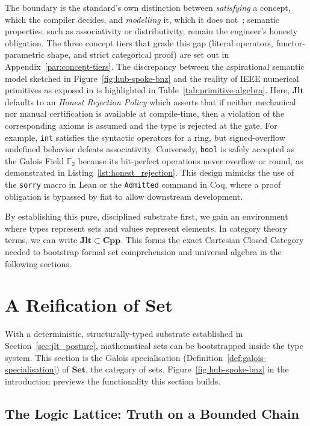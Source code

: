 \documentclass[11pt, a4paper]{article}
\begin{document}
The boundary is the standard's own distinction between \emph{satisfying} a concept, which the compiler decides, and \emph{modelling} it, which it does not~\cite{krautler2026jlt}; semantic properties, such as associativity or distributivity, remain the engineer's honesty obligation.
The three concept tiers that grade this gap (literal operators, functor-parametric shape, and strict categorical proof) are set out in Appendix~\ref{par:concept-tiers}.
The discrepancy between the aspirational semantic model sketched in Figure~\ref{fig:hub-spoke-bnz} and the reality of IEEE numerical primitives as exposed in  is highlighted in Table~\ref{tab:primitive-algebra}.
Here, $\mathbf{Jlt}$ defaults to an \emph{Honest Rejection Policy} which asserts that if neither mechanical nor manual certification is available at compile-time, then a violation of the corresponding axioms is assumed and the type is rejected at the gate.
For example, \texttt{int} satisfies the syntactic operators for a ring, but signed-overflow undefined behavior defeats associativity.
Conversely, \texttt{bool} is safely accepted as the Galois Field $\mathbb{F}_2$ because its bit-perfect operations never overflow or round, as demonstrated in Listing~\ref{lst:honest_rejection}.
This design mimicks the use of the \texttt{sorry} macro in Lean or the \texttt{Admitted} command in Coq, where a proof obligation is bypassed by fiat to allow downstream development.


By establishing this pure, disciplined substrate first, we gain an environment where types represent sets and values represent elements.
In category theory terms, we can write $\mathbf{Jlt} \subset \mathbf{Cpp}$.
This forms the exact Cartesian Closed Category needed to bootstrap formal set comprehension and universal algebra in the following sections.

\section{A Reification of $\mathbf{Set}$}
\label{sec:intensional_sets}

With a deterministic, structurally-typed substrate established in Section~\ref{sec:jlt_posture}, mathematical sets can be bootstrapped inside the type system.
This section is the Galois specialisation (Definition~\ref{def:galois-specialisation}) of $\mathbf{Set}$, the category of sets.
Figure~\ref{fig:hub-spoke-bnz} in the introduction previews the functionality this section builds.
\subsection{The Logic Lattice: Truth on a Bounded Chain}
\label{sec:logic_lattice}
\end{document}
